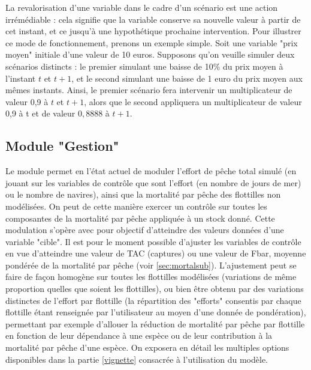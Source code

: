 \documentclass[12pt, colorinlistoftodos, notitlepage]{report}
\newenvironment{not used}[1]{%
    \longtable{%
        |>{\centering$\displaystyle}A{#1}{1}<{$}%
        |}\hline\ignorespaces}{%
    \endlongtable\ignorespacesafterend}
\begin{document}
La revalorisation d'une variable dans le cadre d'un scénario est une action irrémédiable : cela signifie que la variable conserve sa nouvelle valeur à partir de cet instant, et ce jusqu'à une hypothétique prochaine intervention. Pour illustrer ce mode de fonctionnement, prenons un exemple simple. Soit une variable "prix moyen" initiale d'une valeur de 10 euros. Supposons qu'on veuille simuler deux scénarios distincts : le premier simulant une baisse de 10\% du prix moyen à l'instant $t$ et $t+1$, et le second simulant une baisse de 1 euro du prix moyen aux mêmes instants. Ainsi, le premier scénario fera intervenir un multiplicateur de valeur 0,9 à $t$ et $t+1$, alors que le second appliquera un multiplicateur de valeur 0,9 à t et de valeur $0,8888$ à $t+1$.

\subsection{Module "Gestion"}

Le module permet en l'état actuel de moduler l'effort de pêche total simulé (en jouant sur les variables de contrôle que sont l’effort (en nombre de jours de mer) ou le nombre de navires), ainsi que la mortalité par pêche des flottilles non modélisées. On peut de cette manière exercer un contrôle sur toutes les composantes de la mortalité par pêche appliquée à un stock donné. Cette modulation s'opère avec pour objectif d'atteindre des valeurs données d'une variable "cible". Il est pour le moment possible d'ajuster les variables de contrôle en vue d'atteindre une valeur de TAC (captures) ou une valeur de Fbar, moyenne pondérée de la mortalité par pêche (voir \ref{sec:mortalsub}). L'ajustement peut se faire de façon homogène sur toutes les flottilles modélisées (variations de même proportion quelles que soient les flottilles), ou bien être obtenu par des variations distinctes de l'effort par flottille (la répartition des "efforts" consentis par chaque flottille étant renseignée par l'utilisateur au moyen d'une donnée de pondération), permettant par exemple d'allouer la réduction de mortalité par pêche par flottille en fonction de leur dépendance à une espèce ou de leur contribution à la mortalité par pêche d’une espèce. On exposera en détail les multiples options disponibles dans la partie \ref{vignette} consacrée à l'utilisation du modèle.
\end{document}
